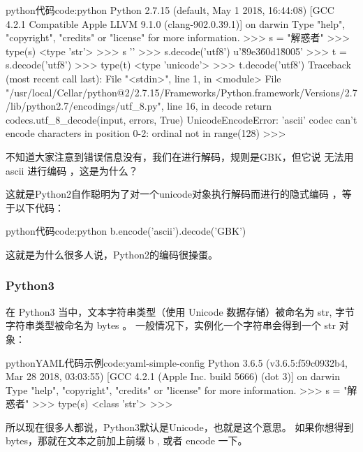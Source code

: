 \begin{jcode}{python}{代码}{code:python}
Python 2.7.15 (default, May  1 2018, 16:44:08)
[GCC 4.2.1 Compatible Apple LLVM 9.1.0 (clang-902.0.39.1)] on darwin
Type "help", "copyright", "credits" or "license" for more information.
>>> s = "解惑者"
>>> type(s)
<type 'str'>
>>> s
''
>>> s.decode('utf8')
u'\u89e3\u60d1\u8005'
>>> t = s.decode('utf8')
>>> type(t)
<type 'unicode'>
>>> t.decode('utf8')
Traceback (most recent call last):
  File "<stdin>", line 1, in <module>
  File "/usr/local/Cellar/python@2/2.7.15/Frameworks/Python.framework/Versions/2.7/lib/python2.7/encodings/utf_8.py", line 16, in decode
    return codecs.utf_8_decode(input, errors, True)
UnicodeEncodeError: 'ascii' codec can't encode characters in position 0-2: ordinal not in range(128)
>>>
\end{jcode}


不知道大家注意到错误信息没有，我们在进行解码，规则是GBK，但它说 无法用 ascii 进行编码 ，这是为什么？

这就是Python2自作聪明为了对一个unicode对象执行解码而进行的隐式编码 ，等于以下代码：

\begin{jcode}{python}{代码}{code:python}
b.encode('ascii').decode('GBK')
\end{jcode}

这就是为什么很多人说，Python2的编码很操蛋。




\subsubsection{Python3}
在 Python3 当中，文本字符串类型（使用 Unicode 数据存储）被命名为 str, 字节字符串类型被命名为 bytes 。
一般情况下，实例化一个字符串会得到一个 str 对象：

\begin{jcode}{python}{YAML代码示例}{code:yaml-simple-config}
Python 3.6.5 (v3.6.5:f59c0932b4, Mar 28 2018, 03:03:55)
[GCC 4.2.1 (Apple Inc. build 5666) (dot 3)] on darwin
Type "help", "copyright", "credits" or "license" for more information.
>>> s = "解惑者"
>>> type(s)
<class 'str'>
>>>
\end{jcode}

所以现在很多人都说，Python3默认是Unicode，也就是这个意思。
如果你想得到bytes，那就在文本之前加上前缀 b , 或者 encode 一下。


